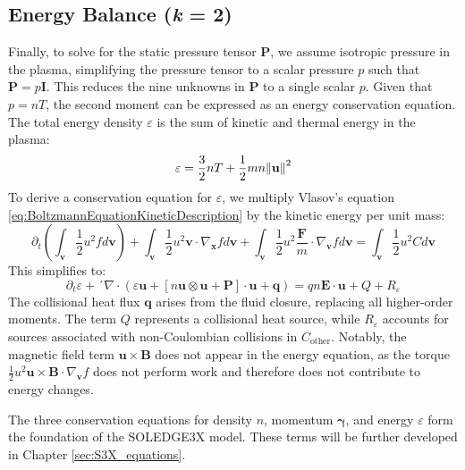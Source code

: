 \subsection{Energy Balance (\textit{k} = 2)}
\label{ssec:desc_energyBalance}
Finally, to solve for the static pressure tensor $\boldsymbol{P}$, we assume isotropic pressure in the plasma, simplifying the pressure tensor to a scalar pressure $p$ such that $\boldsymbol{P} = p \boldsymbol{I}$. This reduces the nine unknowns in $\boldsymbol{P}$ to a single scalar $p$. Given that $p = nT$, the second moment can be expressed as an energy conservation equation. The total energy density $\varepsilon$ is the sum of kinetic and thermal energy in the plasma:
\begin{equation}
	\varepsilon = \frac{3}{2} nT + \frac{1}{2} mn \norm{\mathbf{u}}^2
\end{equation}
To derive a conservation equation for $\varepsilon$, we multiply Vlasov's equation \ref{eq:BoltzmannEquationKineticDescription} by the kinetic energy per unit mass:
\begin{equation}
	\partial_t \left( \int_\mathbf{v} \frac{1}{2} u^2 f d\mathbf{v} \right) + \int_\mathbf{v} \frac{1}{2} u^2 \mathbf{v} \cdot \nabla_{\mathbf{x}} f d\mathbf{v} + \int_\mathbf{v} \frac{1}{2} u^2 \frac{\mathbf{F}}{m} \cdot \nabla_{\mathbf{v}} f d\mathbf{v} = \int_\mathbf{v} \frac{1}{2} u^2 C d\mathbf{v}
\end{equation}
This simplifies to:
\begin{equation}
	\label{eq:SecondMomentTransportEquation}
	\partial_t \varepsilon + ´\nabla \cdot \left( \varepsilon \mathbf{u} + \left[ n \mathbf{u} \otimes \mathbf{u} + \boldsymbol{P} \right] \cdot \mathbf{u} + \mathbf{q} \right) = qn \mathbf{E} \cdot \mathbf{u} + Q + R_\varepsilon
\end{equation}
The collisional heat flux $\mathbf{q}$ arises from the fluid closure, replacing all higher-order moments. The term $Q$ represents a collisional heat source, while $R_\varepsilon$ accounts for sources associated with non-Coulombian collisions in $C_{\text{other}}$. Notably, the magnetic field term $\mathbf{u} \times \mathbf{B}$ does not appear in the energy equation, as the torque $\frac{1}{2} u^2 \mathbf{u} \times \mathbf{B} \cdot \nabla_{\mathbf{v}} f$ does not perform work and therefore does not contribute to energy changes. \newline

The three conservation equations for density $n$, momentum $\boldsymbol{\gamma}$, and energy $\varepsilon$ form the foundation of the SOLEDGE3X model. These terms will be further developed in Chapter \ref{sec:S3X_equations}.




